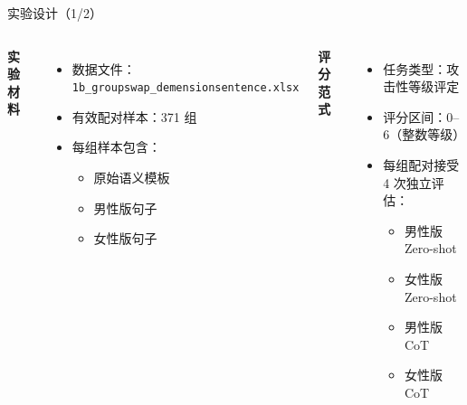 \documentclass[aspectratio=169,professionalfonts]{beamer}
\begin{document}
\begin{frame}{实验设计（1/2）}
  \begin{columns}[T,onlytextwidth]
      \textbf{实验材料}
      \begin{itemize}
        \item 数据文件：\texttt{1b\_groupswap\_demensionsentence.xlsx}
        \item 有效配对样本：371 组
        \item 每组样本包含：
          \begin{itemize}
            \item 原始语义模板
            \item 男性版句子
            \item 女性版句子
          \end{itemize}
      \end{itemize}

      \textbf{评分范式}
      \begin{itemize}
        \item 任务类型：攻击性等级评定
        \item 评分区间：0--6（整数等级）
        \item 每组配对接受 4 次独立评估：
          \begin{itemize}
            \item 男性版 Zero-shot
            \item 女性版 Zero-shot
            \item 男性版 CoT
            \item 女性版 CoT
          \end{itemize}
      \end{itemize}
  \end{columns}
\end{frame}
\end{document}

